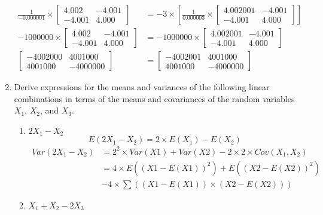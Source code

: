 \documentclass[12pt,a4paper]{paper}
\begin{document}
\begin{enumerate}
\begin{equation}
\begin{split}
\frac{1}{-0.000001}\times\left[ \begin{array}{cc}4.002 & -4.001 \\-4.001 & 4.000\end{array} \right] & = -3\times\left[\frac{1}{0.000003}\times\left[ \begin{array}{cc}4.002001 & -4.001 \\-4.001 & 4.000 \end{array} \right]\right]\\
-1000000 \times \left[ \begin{array}{cc}4.002 & -4.001 \\-4.001 & 4.000\end{array} \right] &= -1000000 \times \left[ \begin{array}{cc}4.002001 & -4.001 \\-4.001 & 4.000 \end{array} \right] \\
\left[ \begin{array}{cc}-4002000 & 4001000 \\4001000 & -4000000\end{array} \right] &= \left[ \begin{array}{cc}-4002001 & 4001000 \\4001000 & -4000000 \end{array} \right]
\end{split}
\end{equation}
\item Derive expressions for the means and variances of the following linear combinations in terms of the means and covariances of the random variables $X_{1}$, $X_{2}$, and $X_{3}$.
\begin{enumerate}
\item $2X_{1} - X_{2}$
\begin{equation}
E(2X_{1} - X_{2}) = 2\times E(X_{1}) - E(X_{2})
\end{equation}
\begin{equation}
\begin{split}
Var(2X_{1} - X_{2})&= 2^2 \times Var(X1) + Var(X2) - 2 \times 2 \times Cov(X_{1},X_{2})\\
&= 4 \times E((X1-E(X1))^2) + E((X2-E(X2))^2) \\&- 4 \times \sum{((X1-E(X1)) \times (X2-E(X2)))}
\end{split}
\end{equation}
\item $X_{1} +X_{2}-2X_{3}$
\begin{equation}

\end{equation}
\end{enumerate}
\end{enumerate}
\end{document}
